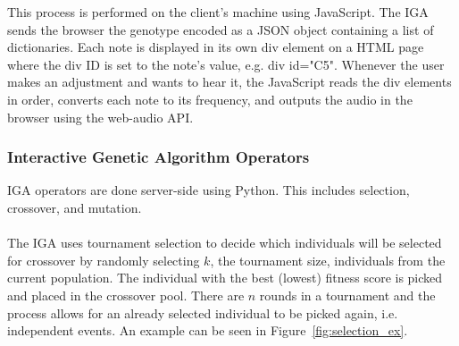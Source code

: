 \documentclass[12pt]{article} %
\begin{document}
This process is performed on the client's machine using JavaScript. The IGA sends the browser the genotype encoded as a JSON object containing a list of dictionaries. Each note is displayed in its own div element on a HTML page where the div ID is set to the note's value, e.g. div id="C5". Whenever the user makes an adjustment and wants to hear it, the JavaScript reads the div elements in order, converts each note to its frequency, and outputs the audio in the browser using the web-audio API.%

\subsubsection{Interactive Genetic Algorithm Operators}
IGA operators are done server-side using Python. This includes selection, crossover, and mutation.\\
\\
The IGA uses tournament selection to decide which individuals will be selected for crossover by randomly selecting $k$, the tournament size, individuals from the current population. The individual with the best (lowest) fitness score is picked and placed in the crossover pool. There are $n$ rounds in a tournament and the process allows for an already selected individual to be picked again, i.e. independent events. An example can be seen in Figure~\ref{fig:selection_ex}.
\end{document}
